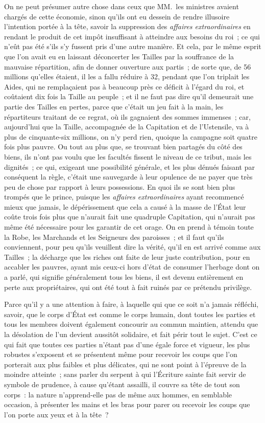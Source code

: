 \documentclass[french,twoside]{book} %
\begin{document}
On ne peut présumer autre chose dans ceux que MM. les ministres avaient chargés de cette économie, sinon qu’ils ont eu dessein de rendre illusoire l’intention portée à la tête, savoir la suppression des {\itshape affaires extraordinaires} en rendant le produit de cet impôt insuffisant à atteindre aux besoins du roi ; ce qui n’eût pas été s’ils s’y fussent pris d’une autre manière. Et cela, par le même esprit que l’on avait eu en laissant déconcerter les Tailles par la souffrance de la mauvaise répartition, afin de donner ouverture aux partis ; de sorte que, de 56 millions qu’elles étaient, il les a fallu réduire à 32, pendant que l’on triplait les Aides, qui ne remplaçaient pas à beaucoup près ce déficit à l’égard du roi, et coûtaient dix fois la Taille au peuple ; et il ne faut pas dire qu’il demeurait une partie des Tailles en pertes, parce que c’était un jeu fait à la main, les répartiteurs traitant de ce regrat, où ils gagnaient des sommes immenses ; car, aujourd’hui que la Taille, accompagnée de la Capitation et de l’Ustensile, va à plus de cinquante-six millions, on n’y perd rien, quoique la campagne soit quatre fois plus pauvre. Ou tout au plus que, se trouvant bien partagés du côté des biens, ils n’ont pas voulu que les facultés fissent le niveau de ce tribut, mais les dignités ; ce qui, exigeant une possibilité générale, et les plus dénués faisant par conséquent la règle, c’était une sauvegarde à leur opulence de ne payer que très peu de chose par rapport à leurs possessions. En quoi ils se sont bien plus trompés que le prince, puisque les {\itshape affaires extraordinaires} ayant recommencé mieux que jamais, le dépérissement que cela a causé à la masse de l’État leur coûte trois fois plus que n’aurait fait une quadruple Capitation, qui n’aurait pas même été nécessaire pour les garantir de cet orage. On en prend à témoin toute la Robe, les Marchands et les Seigneurs des paroisses ; et il faut qu’ils conviennent, pour peu qu’ils veuillent dire la vérité, qu’il en est arrivé comme aux Tailles ; la décharge que les riches ont faite de leur juste contribution, pour en accabler les pauvres, ayant mis ceux-ci hors d’état de consumer l’herbage dont on a parlé, qui signifie généralement tous les biens, il est devenu entièrement en perte aux propriétaires, qui ont été tout à fait ruinés par ce prétendu privilège.\par
Parce qu’il y a une attention à faire, à laquelle qui que ce soit n’a jamais réfléchi, savoir, que le corps d’État est comme le corps humain, dont toutes les parties et tous les membres doivent également concourir au commun maintien, attendu que la désolation de l’un devient aussitôt solidaire, et fait périr tout le sujet. C’est ce qui fait que toutes ces parties n’étant pas d’une égale force et vigueur, les plus robustes s’exposent et se présentent même pour recevoir les coups que l’on porterait aux plus faibles et plus délicates, qui ne sont point à l’épreuve de la moindre atteinte ; sans parler du serpent à qui l’Écriture sainte fait servir de symbole de prudence, à cause qu’étant assailli, il couvre sa tête de tout son corps : la nature n’apprend-elle pas de même aux hommes, en semblable occasion, à présenter les mains et les bras pour parer ou recevoir les coups que l’on porte aux yeux et à la tête ?\par
\end{document}
